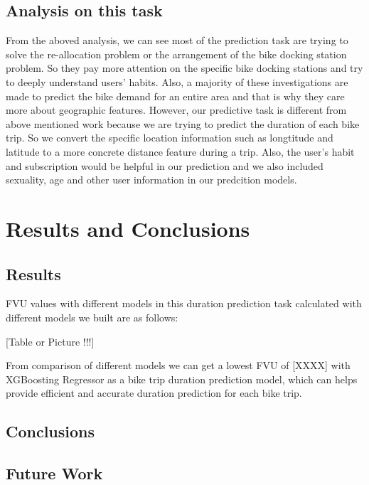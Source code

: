 \subsection{Analysis on this task}
From the aboved analysis, we can see most of the prediction task are trying to solve the re-allocation problem or the arrangement of the bike docking station problem. So they pay more attention on the specific bike docking stations and try to deeply understand users' habits. Also, a majority of these investigations are made to predict the bike demand for an entire area and that is why they care more about geographic features. However, our predictive task is different from above mentioned work because we are trying to predict the duration of each bike trip. So we convert the specific location information such as longtitude and latitude to a more concrete distance feature during a trip. Also, the user's habit and subscription would be helpful in our prediction and we also included sexuality, age and other user information in our predcition models. 

\section{Results and Conclusions}

\subsection{Results}
FVU values with different models in this duration prediction task calculated with different models we built are as follows:

[Table or Picture !!!]

From comparison of different models we can get a lowest FVU of [XXXX] with XGBoosting Regressor as a bike trip duration prediction model, which can helps provide efficient and accurate duration prediction for each bike trip.

\subsection{Conclusions}

\subsection{Future Work}


